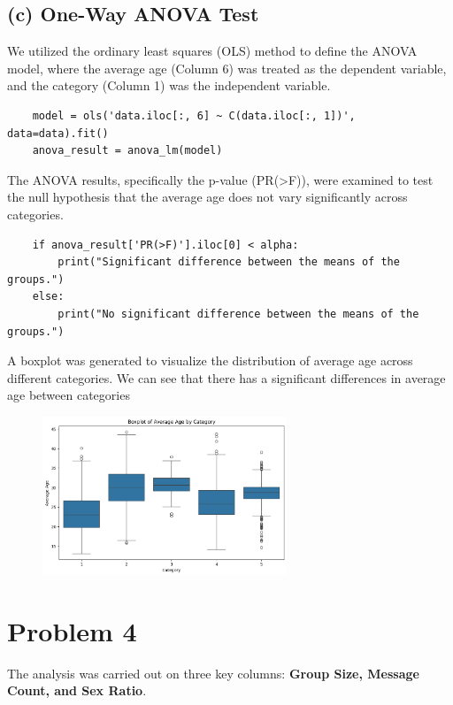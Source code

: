 \documentclass[12pt]{article}
\begin{document}
\subsection*{(c) One-Way ANOVA Test}

We utilized the ordinary least squares (OLS) method to define the ANOVA model, where the average age (Column 6) was treated as the dependent variable, and the category (Column 1) was the independent variable.


\begin{verbatim}
    model = ols('data.iloc[:, 6] ~ C(data.iloc[:, 1])', data=data).fit()
    anova_result = anova_lm(model)
\end{verbatim}
The ANOVA results, specifically the p-value (PR(>F)), were examined to test the null hypothesis that the average age does not vary significantly across categories.

\begin{verbatim}
    if anova_result['PR(>F)'].iloc[0] < alpha:
        print("Significant difference between the means of the groups.")
    else:
        print("No significant difference between the means of the groups.")
\end{verbatim}

A boxplot was generated to visualize the distribution of average age across different categories. We can see that there has a significant differences in average age between categories

\begin{figure}[h]
    \centering
    \includegraphics[width=0.65\textwidth]{image/output2.png}  
    \label{fig:Output for ANOVA test}
\end{figure}

\newpage
\section*{Problem 4}
The analysis was carried out on three key columns: \textbf{Group Size, Message Count, and Sex Ratio}.
\end{document}
